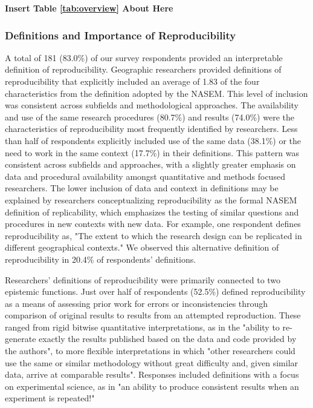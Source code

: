 \documentclass[]{interact}
\theoremstyle{plain}%
\theoremstyle{definition}
\theoremstyle{remark}
\begin{document}
\begin{center}
\textbf{Insert Table \ref{tab:overview} About Here}
\end{center}


\subsubsection*{Definitions and Importance of Reproducibility}
A total of 181 (83.0\%) of our survey respondents provided an interpretable definition of reproducibility.  
Geographic researchers provided definitions of reproducibility that explicitly included an average of 1.83 of the four characteristics from the definition adopted by the NASEM.
This level of inclusion was consistent across subfields and methodological approaches.
The availability and use of the same research procedures (80.7\%) and results (74.0\%) were the characteristics of reproducibility most frequently identified by researchers. 
Less than half of respondents explicitly included use of the same data (38.1\%) or the need to work in the same context (17.7\%) in their definitions. 
This pattern was consistent across subfields and approaches, with a slightly greater emphasis on data and procedural availability amongst quantitative and methods focused researchers.
The lower inclusion of data and context in definitions may be explained by researchers conceptualizing reproducibility as the formal NASEM definition of replicability, which emphasizes the testing of similar questions and procedures in new contexts with new data. 
For example, one respondent defines reproducibility as, "The extent to which the research design can be replicated in different geographical contexts."
We observed this alternative definition of reproducibility in 20.4\% of respondents' definitions.

Researchers' definitions of reproducibility were primarily connected to two epistemic functions.
Just over half of respondents (52.5\%) defined reproducibility as a means of assessing prior work for errors or inconsistencies through comparison of original results to results from an attempted reproduction.
These ranged from rigid bitwise quantitative interpretations, as in the "ability to re-generate exactly the results published based on the data and code provided by the authors", to more flexible interpretations in which "other researchers could use the same or similar methodology without great difficulty and, given similar data, arrive at comparable results".
Responses included definitions with a focus on experimental science, as in "an ability to produce consistent results when an experiment is repeated!"
\end{document}
